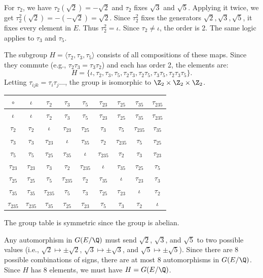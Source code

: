 \begin{solution}[(i)]
  For $\tau_2$, we have $\tau_2(\sqrt{2}) = -\sqrt{2}$ and $\tau_2$ fixes $\sqrt{3}$ and $\sqrt{5}$. Applying it twice, we get $\tau^2_2(\sqrt{2}) = -(-\sqrt{2}) = \sqrt{2}$. Since $\tau_2^2$ fixes the generators $\sqrt{2}, \sqrt{3}, \sqrt{5}$, it fixes every element in $E$. Thus $\tau_2^2 = \iota$. Since $\tau_2 \neq \iota$, the order is 2. The same logic applies to $\tau_3$ and $\tau_5$.
\end{solution}

\begin{solution}[(ii)]
  The subgroup $H = \langle \tau_2, \tau_3, \tau_5 \rangle$ consists of all compositions of these maps. Since they commute (e.g., $\tau_2\tau_3 = \tau_3\tau_2$) and each has order 2, the elements are:
  \[%
    H = \{ \iota, \tau_2, \tau_3, \tau_5, \tau_2\tau_3, \tau_2\tau_5, \tau_3\tau_5, \tau_2\tau_3\tau_5 \}
  .\]%
  Letting $\tau_{ijk} = \tau_i\tau_j\dots$, the group is isomorphic to $\Z_2 \times \Z_2 \times \Z_2$.

  \begin{center}
    \begin{tabular}{c|cccccccc}
      $\circ$ & $\iota$ & $\tau_2$ & $\tau_3$ & $\tau_5$ & $\tau_{23}$ & $\tau_{25}$ & $\tau_{35}$ & $\tau_{235}$ \\ \hline
      $\iota$ & $\iota$ & $\tau_2$ & $\tau_3$ & $\tau_5$ & $\tau_{23}$ & $\tau_{25}$ & $\tau_{35}$ & $\tau_{235}$ \\
      $\tau_2$ & $\tau_2$ & $\iota$ & $\tau_{23}$ & $\tau_{25}$ & $\tau_3$ & $\tau_5$ & $\tau_{235}$ & $\tau_{35}$ \\
      $\tau_3$ & $\tau_3$ & $\tau_{23}$ & $\iota$ & $\tau_{35}$ & $\tau_2$ & $\tau_{235}$ & $\tau_5$ & $\tau_{25}$ \\
      $\tau_5$ & $\tau_5$ & $\tau_{25}$ & $\tau_{35}$ & $\iota$ & $\tau_{235}$ & $\tau_2$ & $\tau_3$ & $\tau_{23}$ \\
      $\tau_{23}$ & $\tau_{23}$ & $\tau_3$ & $\tau_2$ & $\tau_{235}$ & $\iota$ & $\tau_{35}$ & $\tau_{25}$ & $\tau_5$ \\
      $\tau_{25}$ & $\tau_{25}$ & $\tau_5$ & $\tau_{235}$ & $\tau_2$ & $\tau_{35}$ & $\iota$ & $\tau_{23}$ & $\tau_3$ \\
      $\tau_{35}$ & $\tau_{35}$ & $\tau_{235}$ & $\tau_5$ & $\tau_3$ & $\tau_{25}$ & $\tau_{23}$ & $\iota$ & $\tau_2$ \\
      $\tau_{235}$ & $\tau_{235}$ & $\tau_{35}$ & $\tau_{25}$ & $\tau_{23}$ & $\tau_5$ & $\tau_3$ & $\tau_2$ & $\iota$
    \end{tabular}
  \end{center}
  The group table is symmetric since the group is abelian.
\end{solution}

\begin{solution}[(iii)]
  Any automorphism in $G(E/\Q)$ must send $\sqrt{2}$, $\sqrt{3}$, and $\sqrt{5}$ to two possible values (i.e., $\sqrt{2} \mapsto \pm \sqrt{2}$, $\sqrt{3} \mapsto \pm \sqrt{3}$, and $\sqrt{5} \mapsto \pm \sqrt{5}$). Since there are 8 possible combinations of signs, there are at most 8 automorphisms in $G(E/\Q)$. Since $H$ has 8 elements, we must have $H = G(E/\Q)$.
\end{solution}

